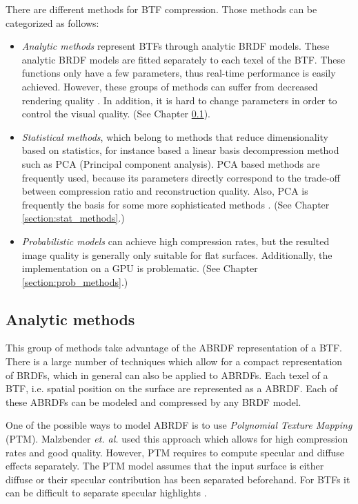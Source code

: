 There are different methods for BTF compression. Those methods can be categorized as follows:

\begin{itemize}
  \item \emph{Analytic methods} represent BTFs through analytic BRDF models. 
These analytic BRDF models are fitted separately to each texel of the BTF. These functions only have a few parameters, thus real-time performance is easily achieved.
However, these groups of methods can suffer from decreased rendering quality \cite{haindl}. In addition, it is hard to change parameters in order to control the visual quality. (See Chapter  \ref{section:analytic_methods}).
   \item \emph{Statistical methods}, which belong to methods that reduce dimensionality based on  statistics, for instance based a linear basis decompression method such as PCA (Principal component analysis). 
    PCA based methods are frequently used, because its parameters directly correspond to the trade-off between compression ratio and reconstruction quality.
    Also, PCA is frequently the basis for some more sophisticated methods \cite{webglbtfstreaming}. (See Chapter \ref{section:stat_methods}.)
   \item \emph{Probabilistic models} can achieve high compression rates, but the resulted image quality is generally only suitable for flat surfaces.
  Additionally, the implementation on a GPU is problematic. (See Chapter \ref{section:prob_methods}.)
 \end{itemize}



 \subsection{Analytic methods}
\label{section:analytic_methods}	
 This group of methods take advantage of the ABRDF representation of a BTF. 
 There is a large number of techniques which allow for a compact representation of BRDFs, which in general can also be applied to ABRDFs.
 Each texel of a BTF, i.e. spatial position on the surface are represented as a ABRDF. Each of these ABRDFs can be modeled and compressed by any BRDF model.
 
One of the possible ways to model ABRDF is to use \emph{Polynomial Texture  Mapping} (PTM).
Malzbender  \emph{et. al.} \cite{PTM} used this approach which allows for high compression rates and good quality. 
However, PTM requires to compute specular and diffuse effects separately. 
The PTM model assumes that the input surface is either diffuse or their specular contribution has been separated beforehand.
For BTFs it can be difficult to separate specular highlights \cite{haindl}.

